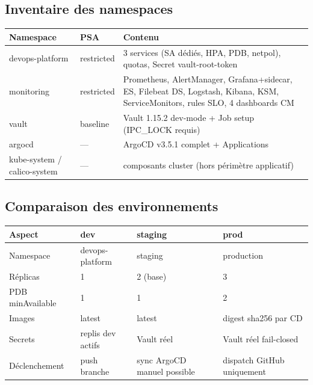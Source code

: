 \documentclass[12pt,a4paper,twoside,openright]{report}
\begin{document}
\subsection{Inventaire des namespaces}
\begin{center}\label{tab:ch-fiches-d-identite-des-outils-majeurs-inventaire-}\end{center}
\begin{longtable}{@{}p{3.4cm}p{2.6cm}p{8.0cm}@{}}
\toprule
\textbf{Namespace} & \textbf{PSA} & \textbf{Contenu} \\
\midrule
\endhead
devops-platform & restricted & 3 services (SA dédiés, HPA, PDB, netpol), quotas, Secret vault-root-token \\
monitoring & restricted & Prometheus, AlertManager, Grafana+sidecar, ES, Filebeat DS, Logstash, Kibana, KSM, ServiceMonitors, rules SLO, 4 dashboards CM \\
vault & baseline & Vault 1.15.2 dev-mode + Job setup (IPC\_LOCK requis) \\
argocd & --- & ArgoCD v3.5.1 complet + Applications \\
kube-system / calico-system & --- & composants cluster (hors périmètre applicatif) \\
\bottomrule
\end{longtable}

\subsection{Comparaison des environnements}
\begin{center}\label{tab:ch-fiches-d-identite-des-outils-majeurs-comparaison}\end{center}
\begin{longtable}{@{}p{3.0cm}p{3.6cm}p{3.6cm}p{3.8cm}@{}}
\toprule
\textbf{Aspect} & \textbf{dev} & \textbf{staging} & \textbf{prod} \\
\midrule
\endhead
Namespace & devops-platform & staging & production \\
Réplicas & 1 & 2 (base) & 3 \\
PDB minAvailable & 1 & 1 & 2 \\
Images & latest & latest & digest sha256 par CD \\
Secrets & replis dev actifs & Vault réel & Vault réel fail-closed \\
Déclenchement & push branche & sync ArgoCD manuel possible & dispatch GitHub uniquement \\
\bottomrule
\end{longtable}
\end{document}
